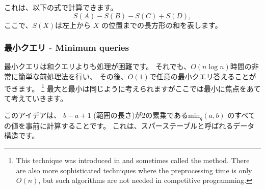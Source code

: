 これは、以下の式で計算できます。
\[S(A) - S(B) - S(C) + S(D),\]
ここで、$S(X )$は左上から $X$ の位置までの長方形の和を表します。

\subsubsection{最小クエリ - Minimum queries}


最小クエリは和クエリよりも処理が困難です。
それでも、$O(n \log n)$時間の非常に簡単な前処理法を行い、
その後、$O(1)$で任意の最小クエリ答えることができます。
\footnote{This technique
was introduced in \cite{ben00} and sometimes
called the  method.
There are also more sophisticated techniques \cite{fis06} where
the preprocessing time is only $O(n)$, but such algorithms
are not needed in competitive programming.}
最大と最小は同じように考えられますがここでは最小に焦点をあてて考えていきます。

このアイデアは、
$b - a + 1$ (範囲の長さ)が2の累乗である$\textrm{min}_q(a,b)$
のすべての値を事前に計算することです。
これは、スパーステーブルと呼ばれるデータ構造です。
\begin{center}
\end{center}

